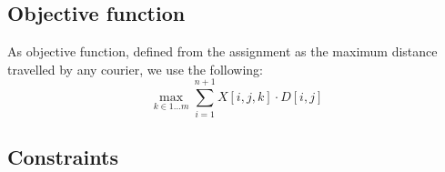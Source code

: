 \subsection{Objective function}
As objective function, defined from the assignment as the maximum distance travelled by any courier, we use the following: 
\begin{equation}
    \max_{k \in 1 \dots m}\sum_{i = 1}^{n+1} X[i,j,k] \cdot D[i,j]
\end{equation}

\subsection{Constraints}

